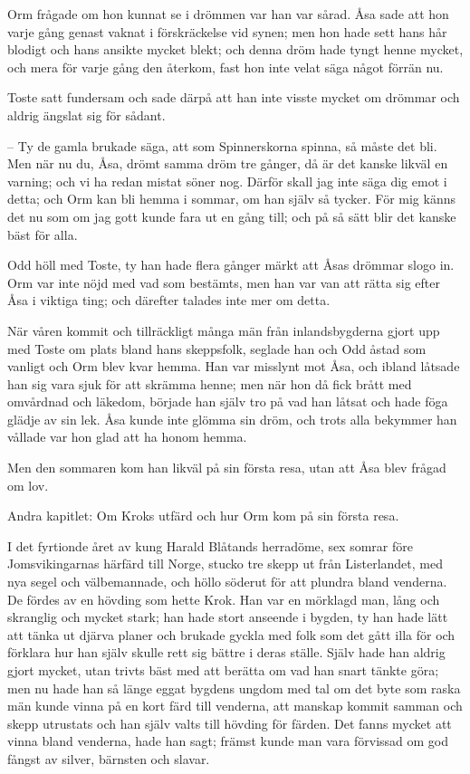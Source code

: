 \initial Orm frågade om hon kunnat se i drömmen var han var sårad. Åsa sade att hon varje gång genast vaknat i förskräckelse vid synen; men hon hade sett hans hår blodigt och hans ansikte mycket blekt; och denna dröm hade tyngt henne mycket, och mera för varje gång den återkom, fast hon inte velat säga något förrän nu.

\initial Toste satt fundersam och sade därpå att han inte visste mycket om drömmar och aldrig ängslat sig för sådant.

– Ty de gamla brukade säga, att som Spinnerskorna spinna, så måste det bli. Men när nu du, Åsa, drömt samma dröm tre gånger, då är det kanske likväl en varning; och vi ha redan mistat söner nog. Därför skall jag inte säga dig emot i detta; och Orm kan bli hemma i sommar, om han själv så tycker. För mig känns det nu som om jag gott kunde fara ut en gång till; och på så sätt blir det kanske bäst för alla.

\initial Odd höll med Toste, ty han hade flera gånger märkt att Åsas drömmar slogo in. Orm var inte nöjd med vad som bestämts, men han var van att rätta sig efter Åsa i viktiga ting; och därefter talades inte mer om detta.

\initial När våren kommit och tillräckligt många män från inlandsbygderna gjort upp med Toste om plats bland hans skeppsfolk, seglade han och Odd åstad som vanligt och Orm blev kvar hemma. Han var misslynt mot Åsa, och ibland låtsade han sig vara sjuk för att skrämma henne; men när hon då fick brått med omvårdnad och läkedom, började han själv tro på vad han låtsat och hade föga glädje av sin lek. Åsa kunde inte glömma sin dröm, och trots alla bekymmer han vållade var hon glad att ha honom hemma.

\initial Men den sommaren kom han likväl på sin första resa, utan att Åsa blev frågad om lov.

%
%


{%
\Red
Andra kapitlet: Om Kroks utfärd och hur Orm kom på sin första resa.}

\biginitial I det fyrtionde året av kung Harald Blåtands herradöme, sex somrar före Jomsvikingarnas härfärd till Norge, stucko tre skepp ut från Listerlandet, med nya segel och välbemannade, och höllo söderut för att plundra bland venderna. De fördes av en hövding som hette Krok. Han var en mörklagd man, lång och skranglig och mycket stark; han hade stort anseende i bygden, ty han hade lätt att tänka ut djärva planer och brukade gyckla med folk som det gått illa för och förklara hur han själv skulle rett sig bättre i deras ställe. Själv hade han aldrig gjort mycket, utan trivts bäst med att berätta om vad han snart tänkte göra; men nu hade han så länge eggat bygdens ungdom med tal om det byte som raska män kunde vinna på en kort färd till venderna, att manskap kommit samman och skepp utrustats och han själv valts till hövding för färden. Det fanns mycket att vinna bland venderna, hade han sagt; främst kunde man vara förvissad om god fångst av silver, bärnsten och slavar.

